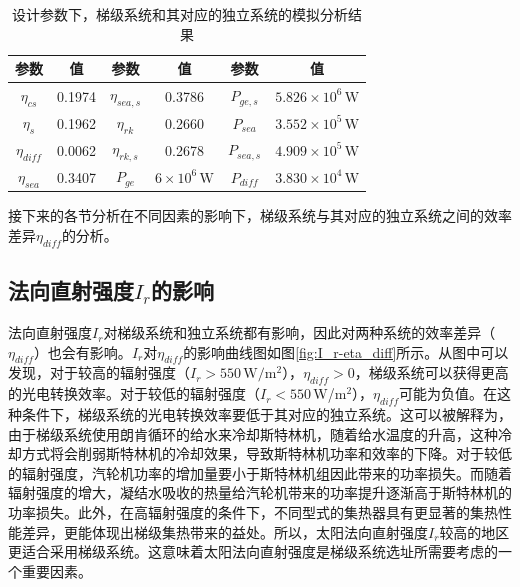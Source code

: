 \begin{table}[htbp]
\setlength{\abovecaptionskip}{-10pt}
	\caption{设计参数下，梯级系统和其对应的独立系统的模拟分析结果}
	\begin{center}
	\begin{tabular}{cccccc}
		\toprule
		参数		&	值	&	参数		&	值	&	参数		&	值\\
		\midrule
		$\eta_{cs}$		&	0.1974	&	$\eta_{sea,s}$	&	0.3786	&	$P_{ge,s}$	&	$5.826\times10^6\,\mathrm{W}$\\
		$\eta_{s}$	&	0.1962	&	$\eta_{rk}$	&	0.2660	&	$P_{sea}$		&	$3.552\times10^5\,\mathrm{W}$\\
		$\eta_{diff}$		&	0.0062	&	$\eta_{rk,s}$	&	0.2678	&	$P_{sea,s}$	&	$4.909\times10^5\,\mathrm{W}$\\
		$\eta_{sea}$	&	0.3407	&	$P_{ge}$		&	$6\times10^6\,\mathrm{W}$	&	$P_{diff}$		&	$3.830\times10^4\,\mathrm{W}$\\
		\bottomrule
	\end{tabular}
	\end{center}
	\label{tab:importantResults}
\end{table}
接下来的各节分析在不同因素的影响下，梯级系统与其对应的独立系统之间的效率差异$\eta_{diff}$的分析。
\subsection{法向直射强度$I_r$的影响}
\label{sec:I_r}

法向直射强度$I_r$对梯级系统和独立系统都有影响，因此对两种系统的效率差异（$\eta_{diff}$）也会有影响。$I_r$对$\eta_{diff}$的影响曲线图如图\ref{fig:I_r-eta_diff}所示。从图中可以发现，对于较高的辐射强度（$I_r > 550\,\mathrm{W/m^2}$），$\eta_{diff}>0$，梯级系统可以获得更高的光电转换效率。对于较低的辐射强度（$I_r < 550\,$W/m$^2$），$\eta_{diff}$可能为负值。在这种条件下，梯级系统的光电转换效率要低于其对应的独立系统。这可以被解释为，由于梯级系统使用朗肯循环的给水来冷却斯特林机，随着给水温度的升高，这种冷却方式将会削弱斯特林机的冷却效果，导致斯特林机功率和效率的下降。对于较低的辐射强度，汽轮机功率的增加量要小于斯特林机组因此带来的功率损失。而随着辐射强度的增大，凝结水吸收的热量给汽轮机带来的功率提升逐渐高于斯特林机的功率损失。此外，在高辐射强度的条件下，不同型式的集热器具有更显著的集热性能差异，更能体现出梯级集热带来的益处。所以，太阳法向直射强度$I_r$较高的地区更适合采用梯级系统。这意味着太阳法向直射强度是梯级系统选址所需要考虑的一个重要因素。

